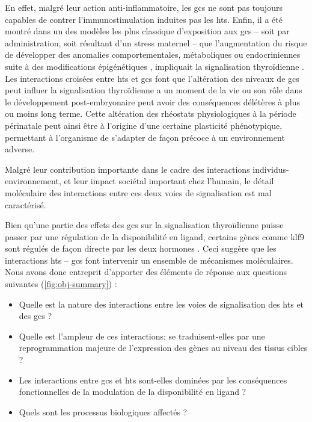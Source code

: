 \documentclass[../main.tex]{subfiles}
\begin{document}
		En effet, malgré leur action anti-inflammatoire, les \glspl{gc} ne sont pas toujours capables de contrer l'immunostimulation induites pas les \glspl{ht}.
		Enfin, il a été montré dans un des modèles les plus classique d'exposition aux \glspl{gc} – soit par administration, soit résultant d'un stress maternel – que l'augmentation du risque de développer des anomalies comportementales, métaboliques ou endocriniennes suite à des modifications épigénétiques \cite{Weaver2004}, impliquait la signalisation thyroïdienne \citep{Hellstrom2012}.
		Les interactions croisées entre \glspl{ht} et \glspl{gc} font que l'altération des niveaux de \glspl{gc} peut influer la signalisation thyroïdienne a un moment de la vie ou son rôle dans le développement post-embryonaire peut avoir des conséquences délétères à plus ou moins long terme.
		Cette altération des rhéostats physiologiques à la période périnatale peut ainsi être à l'origine d'une certaine plasticité phénotypique, permettant à l'organisme de s'adapter de façon précoce à un environnement adverse.
		\par
		Malgré leur contribution importante dans le cadre des interactions individus-environnement, et leur impact sociétal important chez l'humain, le détail moléculaire des interactions entre ces deux voies de signalisation est mal caractérisé.
		\par
		Bien qu'une partie des effets des \glspl{gc} sur la signalisation thyroïdienne puisse passer par une régulation de la disponibilité en ligand, certains gènes comme \gls{klf9} sont régulés de façon directe par les deux hormones \citep{Denver2009b,Bagamasbad2012}.
		Ceci suggère que les interactions \glspl{ht} – \glspl{gc} font intervenir un ensemble de mécanismes moléculaires. 
		Nous avons donc entreprit d'apporter des éléments de réponse aux questions suivantes (\autoref{fig:obj-summary}) :
		\begin{itemize}
			\item
				Quelle est la nature des interactions entre les voies de signalisation des \glspl{ht} et des \glspl{gc} ? 
			\item
				Quelle est l'ampleur de ces interactions; se traduisent-elles par une reprogrammation majeure de l'expression des gènes au niveau des tissus cibles ?
			\item
				Les interactions entre \glspl{gc} et \glspl{ht} sont-elles dominées par les conséquences fonctionnelles de la modulation de la disponibilité en ligand ?
			\item
				Quels sont les processus biologiques affectés ?
		\end{itemize}
		
\end{document}
